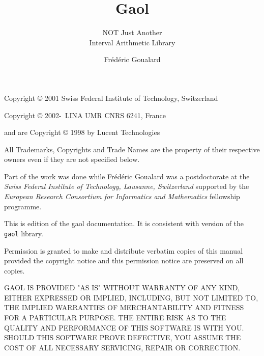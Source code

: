 \documentclass{manual}
\title{Gaol \version}
\subtitle{NOT Just Another \\Interval Arithmetic Library}
\author{Fr\'ed\'eric Goualard}
\institute{Laboratoire d'Informatique de Nantes-Atlantique, France}
\begin{document}
\maketitle

\begin{copyrighttxt}
Copyright \copyright{} 2001 Swiss Federal Institute of Technology, Switzerland

Copyright \copyright{} 2002-\number\year\ LINA UMR CNRS 6241, France

\vskip 4pt
 and  are Copyright \copyright{} 1998 by Lucent Technologies
\vskip 4pt

All Trademarks, Copyrights and Trade Names are the property of their respective owners
even if they are not specified below.

Part of the work was done while Fr\'ed\'eric Goualard was a postdoctorate
at the \emph{Swiss Federal Institute of Technology, Lausanne, Switzerland}
supported by the \emph{European Research Consortium for Informatics and
Mathematics} fellowship programme.

This is edition \edition{} of the gaol documentation.
It is consistent with version \version{} of the \texttt{gaol} library.

Permission is granted to make and distribute verbatim copies of this manual
provided the copyright notice and this permission notice are preserved on all
copies.

\smallskip
GAOL IS PROVIDED "AS IS" WITHOUT WARRANTY OF ANY
KIND, EITHER EXPRESSED OR IMPLIED, INCLUDING, BUT NOT LIMITED TO, THE
IMPLIED WARRANTIES OF MERCHAN\-TA\-BILITY AND FITNESS FOR A PARTICULAR
PURPOSE.  THE ENTIRE RISK AS TO THE QUALITY AND PERFORMANCE OF THIS
SOFTWARE IS WITH YOU.  SHOULD THIS SOFTWARE PRO\-VE DEFECTIVE, YOU ASSUME
THE COST OF ALL NECESSARY SERVICING, REPAIR OR CORRECTION.
\end{copyrighttxt}

\newpage
\thispagestyle{empty}

\vspace*{7cm}
\end{document}

